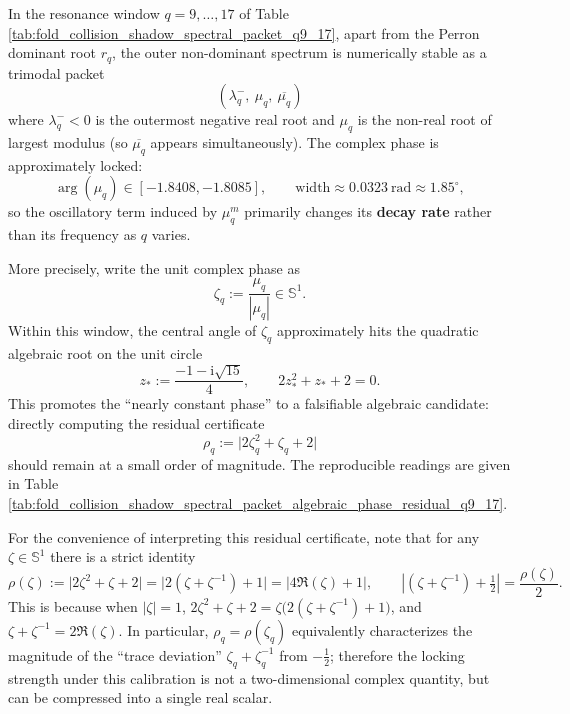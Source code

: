 \begin{remark}\label{rem:pom-resonance-trimodal-phase-lock}
In the resonance window \(q=9,\dots,17\) of Table \ref{tab:fold_collision_shadow_spectral_packet_q9_17}, apart from the Perron dominant root \(r_q\), the outer non-dominant spectrum is numerically stable as a trimodal packet
\[
(\lambda_q^-,\ \mu_q,\ \overline{\mu_q})
\]
where \(\lambda_q^-<0\) is the outermost negative real root and \(\mu_q\) is the non-real root of largest modulus (so \(\overline{\mu_q}\) appears simultaneously).
The complex phase is approximately locked:
\[
\arg(\mu_q)\in[-1.8408,-1.8085],
\qquad
\mathrm{width}\approx 0.0323\ \mathrm{rad}\approx 1.85^\circ,
\]
so the oscillatory term induced by \(\mu_q^m\) primarily changes its \textbf{decay rate} rather than its frequency as \(q\) varies.
\par
More precisely, write the unit complex phase as
\[
\zeta_q:=\frac{\mu_q}{|\mu_q|}\in\mathbb{S}^1.
\]
Within this window, the central angle of \(\zeta_q\) approximately hits the quadratic algebraic root on the unit circle
\[
z_\ast:=\frac{-1-\mathrm{i}\sqrt{15}}{4},
\qquad
2z_\ast^2+z_\ast+2=0.
\]
This promotes the ``nearly constant phase'' to a falsifiable algebraic candidate: directly computing the residual certificate
\[
\rho_q:=\bigl|2\zeta_q^2+\zeta_q+2\bigr|
\]
should remain at a small order of magnitude. The reproducible readings are given in Table \ref{tab:fold_collision_shadow_spectral_packet_algebraic_phase_residual_q9_17}.
\par
For the convenience of interpreting this residual certificate, note that for any \(\zeta\in\mathbb{S}^1\) there is a strict identity
\begin{equation}\label{eq:pom-phase-lock-residual-trace-equivalence}
\rho(\zeta):=\bigl|2\zeta^{2}+\zeta+2\bigr|
=\bigl|2(\zeta+\zeta^{-1})+1\bigr|
=\bigl|4\Re(\zeta)+1\bigr|,
\qquad
\left|(\zeta+\zeta^{-1})+\tfrac12\right|=\frac{\rho(\zeta)}{2}.
\end{equation}
This is because when \(|\zeta|=1\), \(2\zeta^2+\zeta+2=\zeta\bigl(2(\zeta+\zeta^{-1})+1\bigr)\), and \(\zeta+\zeta^{-1}=2\Re(\zeta)\).
In particular, \(\rho_q=\rho(\zeta_q)\) equivalently characterizes the magnitude of the ``trace deviation'' \(\zeta_q+\zeta_q^{-1}\) from \(-\tfrac12\);
therefore the locking strength under this calibration is not a two-dimensional complex quantity, but can be compressed into a single real scalar.

\end{remark}
